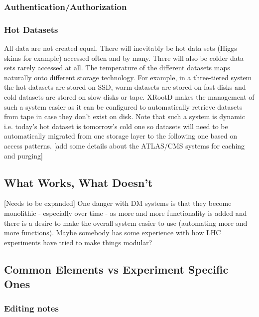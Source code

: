 \subsubsection{Authentication/Authorization} 


\subsubsection{Hot Datasets}
All data are not created equal. There will inevitably be hot data sets (Higgs skims for example) accessed often and by 
many. There will also be colder data sets rarely accessed at all. The temperature of the different datasets maps  
naturally onto different storage technology. For example, in a three-tiered system the hot datasets are stored on SSD, 
warm datasets are stored on fast disks and cold datasets are stored on slow disks or tape. XRootD makes the 
management of such a system easier as it can be configured to automatically retrieve datasets from tape in case they 
don't exist on disk. Note that such a system is dynamic i.e. today's hot dataset is tomorrow's cold one so datasets will 
need to be automatically migrated from one storage layer to the following one based on access patterns. [add some details 
about the ATLAS/CMS systems for caching and purging] 



\subsection{What Works, What Doesn't}
[Needs to be expanded] One danger with DM systems is that they become monolithic - especially over time - as more 
and more functionality is added and there is a desire to make the overall system easier to use (automating more 
and more functions). Maybe somebody has some experience with how LHC experiments have tried to make things modular?


\subsection{Common Elements vs Experiment Specific Ones}



\subsubsection{Editing notes}



